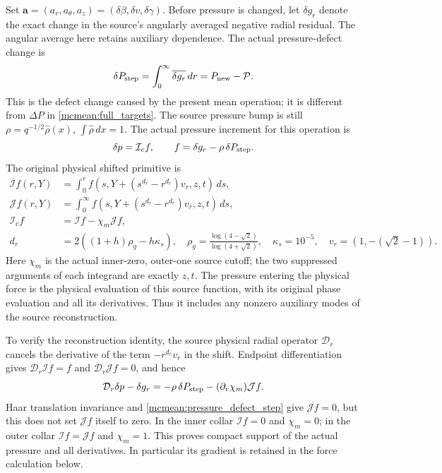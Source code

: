Set \(\boldsymbol a=(a_r,a_\theta,a_z)
=(\delta\beta,\delta v,\delta\gamma)\). Before pressure is
changed, let \(\delta g_r\) denote the exact change in the source's
angularly averaged negative radial residual. The angular average here
retains auxiliary dependence. The actual pressure-defect change is
\begin{equation}\label{mcmean:pressure_defect_step}
 \delta P_{\rm step}=\int_0^\infty\overline{\delta g_r}\,dr
                    =P_{\rm new}-\mathcal P.
\end{equation}
This is the defect change caused by the present mean operation;
it is different from \(\Delta P\) in \eqref{mcmean:full_targets}.
The source pressure bump is still
\(\rho=q^{-1/2}\widehat\rho(x)\),
\(\int\widehat\rho\,dx=1\). The actual pressure increment for this
operation is
\begin{equation}\label{mcmean:actual_pressure}
 \delta p=\mathcal I_c f,\qquad
 f=\delta g_r-\rho\,\delta P_{\rm step}.
\end{equation}
The original physical shifted primitive is
\[
\begin{split}
 \mathcal If(r,Y)&=\int_0^r
  f(s,Y+(s^{d_r}-r^{d_r})v_r,z,t)\,ds,\\
 \mathcal Jf(r,Y)&=\int_0^\infty
  f(s,Y+(s^{d_r}-r^{d_r})v_r,z,t)\,ds,\\
 \mathcal I_cf&=\mathcal If-\chi_m\mathcal Jf,\\
 d_r&=2((1+h)\rho_g-h\kappa_s),\quad
 \rho_g=\frac{\log(4-\sqrt2)}{\log(4+\sqrt2)},\quad
 \kappa_s=10^{-5},\quad v_r=(1,-(\sqrt2-1)).
\end{split}
\]
Here \(\chi_m\) is the actual inner-zero, outer-one source cutoff;
the two suppressed arguments of each integrand are exactly \(z,t\).
The pressure entering the physical force is the physical evaluation of
this source function, with its original phase evaluation and all its
derivatives. Thus it includes any nonzero auxiliary modes of the
source reconstruction.

To verify the reconstruction identity, the source physical radial
operator \(\mathcal D_r\) cancels the derivative of the term
\(-r^{d_r}v_r\) in the shift. Endpoint differentiation gives
\(\mathcal D_r\mathcal If=f\) and
\(\mathcal D_r\mathcal Jf=0\), and hence
\begin{equation}\label{mcmean:pressure_remainder}
 \mathcal D_r\delta p-\delta g_r
 =-\rho\,\delta P_{\rm step}
                  -(\partial_r\chi_m)\mathcal Jf.
\end{equation}
Haar translation invariance and \eqref{mcmean:pressure_defect_step}
give \(\overline{\mathcal Jf}=0\), but this does not set
\(\mathcal Jf\) itself to zero. In the inner collar \(\mathcal If=0\)
and \(\chi_m=0\); in the outer collar \(\mathcal If=\mathcal Jf\)
and \(\chi_m=1\). This proves compact support of the actual pressure
and all derivatives. In particular its gradient is retained in the
force calculation below.

